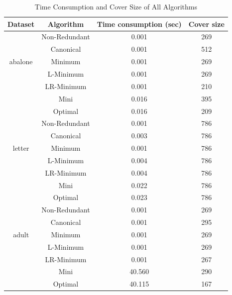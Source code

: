 \documentclass[11pt]{book}
\begin{document}
\begin{table}[H]

	\centering
	
\begin{tabular}{|c|c|c|c|}

    \hline
    Dataset & Algorithm & Time consumption (sec) & Cover size \\
    
    \hline
    \multirow{5}{*}{abalone}
    	& Non-Redundant & 0.001 & 269 \\
    	& Canonical     & 0.001 & 512 \\
    	& Minimum       & 0.001 & 269 \\
    	& L-Minimum     & 0.001 & 269 \\
    	& LR-Minimum    & 0.001 & 210 \\	
    	& Mini          & 0.016 & 395 \\	
    	& Optimal       & 0.016 & 209 \\

    \hline
    \multirow{5}{*}{letter}
    	& Non-Redundant & 0.001 & 786 \\
    	& Canonical     & 0.003 & 786 \\
    	& Minimum       & 0.001 & 786 \\
    	& L-Minimum     & 0.004 & 786 \\
    	& LR-Minimum    & 0.004 & 786 \\	
    	& Mini          & 0.022 & 786 \\	
    	& Optimal       & 0.023 & 786 \\

    \hline
    \multirow{5}{*}{adult}
    	& Non-Redundant & 0.001  & 269 \\
    	& Canonical     & 0.001  & 295 \\
    	& Minimum       & 0.001  & 269 \\
    	& L-Minimum     & 0.001  & 269 \\
    	& LR-Minimum    & 0.001  & 267 \\	
    	& Mini          & 40.560 & 290 \\	
    	& Optimal       & 40.115 & 167 \\
	
    \hline
    
\end{tabular}

	\caption{Time Consumption and Cover Size of All Algorithms}
	
\end{table}
\end{document}
